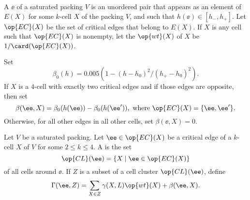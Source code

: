 \begin{definition}\label{def:wt} 
A  $\ee$ of a saturated packing $V$ is an unordered pair
that appears as an element of $E(X)$ for some 
$k$-cell $X$ of the packing $V$, and such that
$h(\ee)\in[h_-,h_+]$.  Let $\op{EC}(X)$ 
be the set of critical edges that belong to $E(X)$.  If $X$ is any cell such
that $\op{EC}(X)$ is nonempty, let the  $\op{wt}(X)$ of $X$ be
$1/\card(\op{EC}(X))$.
\end{definition}
%
%
%

\begin{definition}\label{def:beta} 
Set 
\begin{displaymath} 
\beta_0(h) = 0.005 (1 - (h-h_0)^2/(h_+-h_0)^2).
\end{displaymath}
If $X$ is a $4$-cell with exactly two critical edges and if those edges
are opposite, then set
\begin{displaymath} 
\beta(\ee,X) = \beta_0(h(\ee)) - \beta_0(h(\ee')), 
\text{ where }\op{EC}(X) = \{\ee,\ee'\} .  
\end{displaymath}
Otherwise, for all other edges in all other cells, set $\beta(\ee,X) = 0$.
\end{definition}
%
%

\begin{definition}\label{def:gammaL} 
  Let $V$ be a saturated packing.  Let $\ee\in \op{EC}(X)$ be a
  critical edge of a $k$-cell $X$ of $V$ for some $2\le k\le 4$.  A
   is the set
\begin{displaymath} 
\op{CL}(\ee) = \{X\mid \ee\in \op{EC}(X)\} 
\end{displaymath}
%
of all cells around $\ee$. 
If $Z$ is a subset of a cell cluster $\op{CL}(\ee)$, define
%
\begin{displaymath} 
\Gamma(\ee,Z) = \sum_{X\in Z} \gamma(X,L) \op{wt}(X) +\beta(\ee,X).
\end{displaymath}
%


\end{definition}
%

